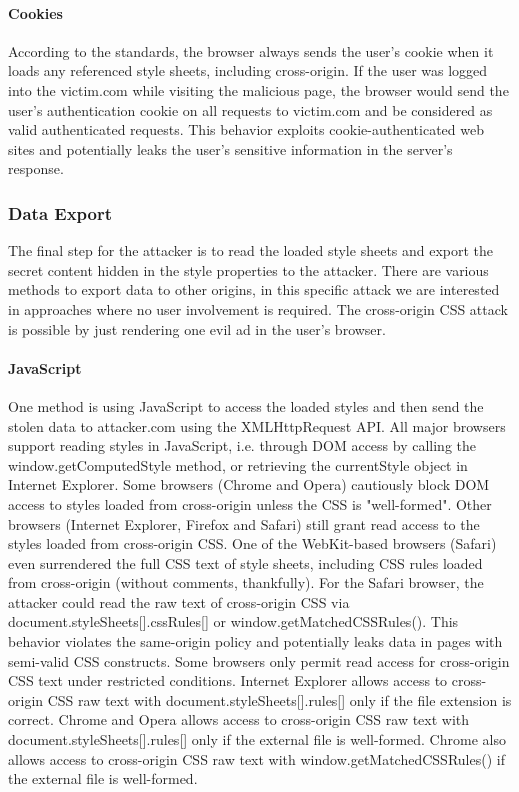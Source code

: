 \documentclass{acm_proc_article-sp}
\begin{document}
\paragraph{Cookies}
According to the standards, the browser always sends the user's cookie when it loads any referenced style sheets, including cross-origin. If the user was logged into the victim.com while visiting the malicious page, the browser would send the user's authentication cookie on all requests to victim.com and be considered as valid authenticated requests. This behavior exploits cookie-authenticated web sites and potentially leaks the user's sensitive information in the server's response. 

\subsubsection{Data Export}
The final step for the attacker is to read the loaded style sheets and export the secret content hidden in the style properties to the attacker. There are various methods to export data to other origins, in this specific attack we are interested in approaches where no user involvement is required. The cross-origin CSS attack is possible by just rendering one evil ad in the user's browser. 

\paragraph{JavaScript}
One method is using JavaScript to access the loaded styles and then send the stolen data to attacker.com using the XMLHttpRequest API. All major browsers support reading styles in JavaScript, i.e. through DOM access by calling the window.getComputedStyle method, or retrieving the currentStyle object in Internet Explorer. Some browsers (Chrome and Opera) cautiously block DOM access to styles loaded from cross-origin unless the CSS is "well-formed". Other browsers (Internet Explorer, Firefox and Safari) still grant read access to the styles loaded from cross-origin CSS. One of the WebKit-based browsers (Safari) even surrendered the full CSS text of style sheets, including CSS rules loaded from cross-origin (without comments, thankfully). For the Safari browser, the attacker could read the raw text of cross-origin CSS via document.styleSheets[].cssRules[] or window.getMatchedCSSRules(). This behavior violates the same-origin policy and potentially leaks data in pages with semi-valid CSS constructs. Some browsers only permit read access for cross-origin CSS text under restricted conditions. Internet Explorer allows access to cross-origin CSS raw text with document.styleSheets[].rules[] only if the file extension is correct. Chrome and Opera allows access to cross-origin CSS raw text with document.styleSheets[].rules[] only if the external file is well-formed. Chrome also allows access to cross-origin CSS raw text with window.getMatchedCSSRules() if the external file is well-formed. 
\end{document}
